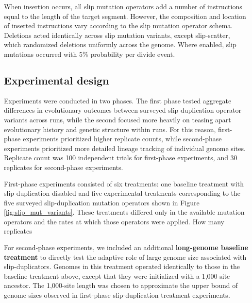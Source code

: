 When insertion occurs, all slip mutation operators add a number of instructions equal to the length of the target segment.
However, the composition and location of inserted instructions vary according to the slip mutation operator schema.
Deletions acted identically across slip mutation variants, except slip-scatter, which randomized deletions uniformly across the genome.
Where enabled, slip mutations occurred with 5\% probability per divide event.

\subsection{Experimental design}

Experiments were conducted in two phases.
The first phase tested aggregate differences in evolutionary outcomes between surveyed slip duplication operator variants across runs, while the second focused more heavily on teasing apart evolutionary history and genetic structure within runs.
For this reason, first-phase experiments prioritized higher replicate counts, while second-phase experiments prioritized more detailed lineage tracking of individual genome sites.
Replicate count was 100 independent trials for first-phase experiments, and 30 replicates for second-phase experiments.

First-phase experiments consisted of six treatments: one baseline treatment with slip-duplication disabled and five experimental treatments corresponding to the five surveyed slip-duplication mutation operators shown in Figure \ref{fig:slip_mut_variants}.
These treatments differed only in the available mutation operators and the rates at which those operators were applied.
How many replicates


For second-phase experiments, we included an additional \textbf{long-genome baseline treatment} to directly test the adaptive role of large genome size associated with slip-duplicators.
Genomes in this treatment operated identically to those in the baseline treatment above, except that they were initialized with a 1,000-site ancestor.
The 1,000-site length was chosen to approximate the upper bound of genome sizes observed in first-phase slip-duplication treatment experiments.


